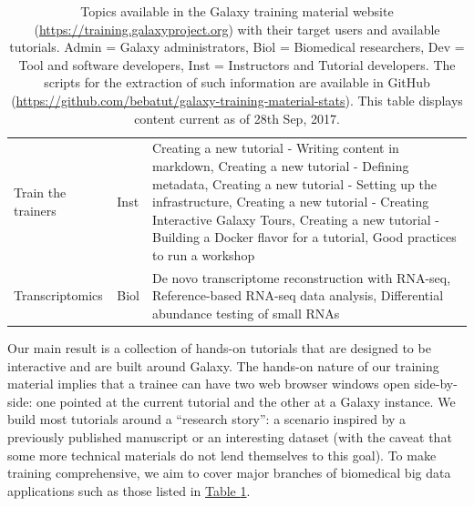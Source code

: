 \begin{table}{}
\begin{tabular}{llp{10cm}}
    Train the trainers & Inst & Creating a new tutorial - Writing content in markdown, Creating a new tutorial - Defining metadata, Creating a new tutorial - Setting up the infrastructure, Creating a new tutorial - Creating Interactive Galaxy Tours, Creating a new tutorial - Building a Docker flavor for a tutorial, Good practices to run a workshop \\

    Transcriptomics & Biol & De novo transcriptome reconstruction with RNA-seq, Reference-based RNA-seq data analysis, Differential abundance testing of small RNAs \\

    \hline
    \end{tabular}
    \caption{Topics available in the Galaxy training material website (\url{https://training.galaxyproject.org}) with their target users and available tutorials. Admin = Galaxy administrators, Biol = Biomedical researchers, Dev = Tool and software developers, Inst = Instructors and Tutorial developers. The scripts for the extraction of such information are available in GitHub (\url{https://github.com/bebatut/galaxy-training-material-stats}). This table displays content current as of 28th Sep, 2017.}
    \label{table:tutorialtable}
\end{table}

Our main result is a collection of hands-on tutorials that are designed to be interactive and are built around Galaxy. The hands-on nature of our training material implies that a trainee can have two web browser windows open side-by-side: one pointed at the current tutorial and the other at a Galaxy instance. We build most tutorials around a “research story”: a scenario inspired by a previously published manuscript or an interesting dataset (with the caveat that some more technical materials do not lend themselves to this goal). To make training comprehensive, we aim to cover major branches of biomedical big data applications such as those listed in \hyperref[table:tutorialtable]{Table \ref*{table:tutorialtable}}.

